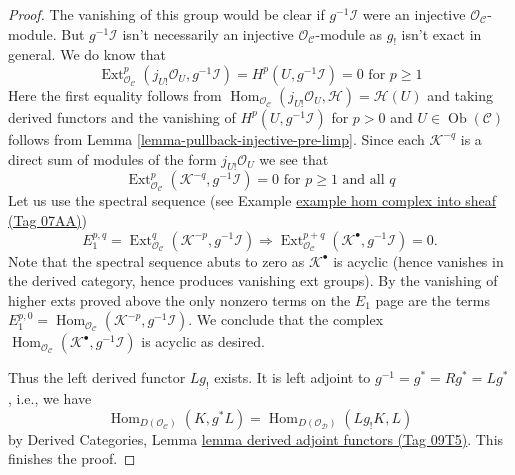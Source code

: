 \documentclass{amsart}
\theoremstyle{plain}
\theoremstyle{definition}
\theoremstyle{remark}
\numberwithin{equation}{subsection}
\def\Hom{\mathop{\mathrm{Hom}}\nolimits}
\def\Ext{\mathop{\mathrm{Ext}}\nolimits}
\def\Ob{\mathop{\mathrm{Ob}}\nolimits}
\begin{document}
\begin{proof}
\medskip\noindent
The vanishing of this group would be clear if $g^{-1}\mathcal{I}$
were an injective $\mathcal{O}_\mathcal{C}$-module. But
$g^{-1}\mathcal{I}$ isn't necessarily an injective
$\mathcal{O}_\mathcal{C}$-module as $g_!$ isn't exact in
general. We do know that
$$
\Ext^p_{\mathcal{O}_\mathcal{C}}(
j_{U!}\mathcal{O}_U, g^{-1}\mathcal{I}) =
H^p(U, g^{-1}\mathcal{I}) = 0 \text{ for }p \geq 1
$$
Here the first equality follows from
$\Hom_{\mathcal{O}_\mathcal{C}}(j_{U!}\mathcal{O}_U, \mathcal{H}) =
\mathcal{H}(U)$ and taking derived functors and the vanishing of
$H^p(U, g^{-1}\mathcal{I})$ for $p > 0$ and $U \in \Ob(\mathcal{C})$
follows from Lemma \ref{lemma-pullback-injective-pre-limp}.
Since each $\mathcal{K}^{-q}$ is a direct sum of modules of the form
$j_{U!}\mathcal{O}_U$ we see that
$$
\Ext^p_{\mathcal{O}_\mathcal{C}}(\mathcal{K}^{-q}, g^{-1}\mathcal{I}) = 0
\text{ for }p \geq 1\text{ and all }q
$$
Let us use the spectral sequence (see
Example
\href{https://stacks.math.columbia.edu/tag/07AA}{example hom complex into sheaf (Tag 07AA)})
$$
E_1^{p, q} = \Ext^q_{\mathcal{O}_\mathcal{C}}(
\mathcal{K}^{-p}, g^{-1}\mathcal{I})
\Rightarrow
\Ext^{p + q}_{\mathcal{O}_\mathcal{C}}(
\mathcal{K}^\bullet, g^{-1}\mathcal{I}) = 0.
$$
Note that the spectral sequence abuts to zero as $\mathcal{K}^\bullet$
is acyclic (hence vanishes in the derived category, hence produces
vanishing ext groups). By the vanishing of higher exts proved above
the only nonzero terms on the $E_1$ page are the terms
$E_1^{p, 0} = \Hom_{\mathcal{O}_\mathcal{C}}(
\mathcal{K}^{-p}, g^{-1}\mathcal{I})$.
We conclude that the complex
$\Hom_{\mathcal{O}_\mathcal{C}}(
\mathcal{K}^\bullet, g^{-1}\mathcal{I})$
is acyclic as desired.

\medskip\noindent
Thus the left derived functor $Lg_!$ exists.
It is left adjoint to $g^{-1} = g^* = Rg^* = Lg^*$, i.e., we have
\begin{equation}
\label{equation-to-prove}
\Hom_{D(\mathcal{O}_\mathcal{C})}(K, g^*L) =
\Hom_{D(\mathcal{O}_\mathcal{D})}(Lg_!K, L)
\end{equation}
by Derived Categories, Lemma \href{https://stacks.math.columbia.edu/tag/09T5}{lemma derived adjoint functors (Tag 09T5)}.
This finishes the proof.
\end{proof}
\end{document}
